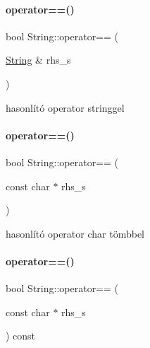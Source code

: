 \mbox{\label{class_string_a1006dbb8a123aed87b8edb33d5cbcee4}} 
\paragraph{\texorpdfstring{operator==()}{operator==()}\hspace{0.1cm}{\footnotesize\ttfamily [1/3]}}
{\footnotesize\ttfamily bool String\+::operator== (\begin{DoxyParamCaption}\item[{\mbox{\hyperlink{class_string}{String}} \&}]{rhs\+\_\+s }\end{DoxyParamCaption})}



hasonlító operator stringgel 

\mbox{\label{class_string_ade9af860a809548214837e33367e8835}} 
\paragraph{\texorpdfstring{operator==()}{operator==()}\hspace{0.1cm}{\footnotesize\ttfamily [2/3]}}
{\footnotesize\ttfamily bool String\+::operator== (\begin{DoxyParamCaption}\item[{const char $\ast$}]{rhs\+\_\+s }\end{DoxyParamCaption})}



hasonlító operator char tömbbel 

\mbox{\label{class_string_aa50c56cbbbc9956cb359a7617f13809b}} 
\paragraph{\texorpdfstring{operator==()}{operator==()}\hspace{0.1cm}{\footnotesize\ttfamily [3/3]}}
{\footnotesize\ttfamily bool String\+::operator== (\begin{DoxyParamCaption}\item[{const char $\ast$}]{rhs\+\_\+s }\end{DoxyParamCaption}) const}

\mbox{\label{class_string_a1a7c5c39d4dafbbf8516f5058a253f1a}} 
